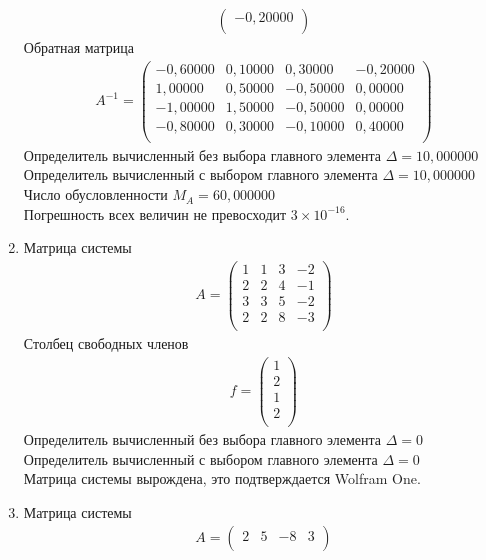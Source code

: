 \documentclass[a4paper,12pt,titlepage,finall]{article}
\begin{document}
\begin{enumerate}
\begin{align*}
\begin{pmatrix}
  -0,20000 \\
\end{pmatrix}
\end{align*}
Обратная матрица
\begin{align*}
A^{-1} = \begin{pmatrix}
-0,60000&     0,10000&     0,30000&    -0,20000 \\
   1,00000&     0,50000&    -0,50000&     0,00000 \\
  -1,00000&     1,50000&    -0,50000&     0,00000 \\
  -0,80000&     0,30000&    -0,10000&     0,40000 \\
\end{pmatrix}
\end{align*}
Определитель вычисленный без выбора главного элемента  $\Delta = 10,000000$\\
Определитель вычисленный с выбором главного элемента $\Delta = 10,000000$\\
Число обусловленности $M_A = 60,000000$\\
Погрешность всех величин не превосходит $3 \times 10^{-16}$.
\item
Матрица системы
\begin{align*}
A = \begin{pmatrix}
1&     1&     3&    -2 \\
   2&     2&     4&    -1 \\
   3&     3&     5&    -2 \\
   2&     2&     8&    -3 \\
\end{pmatrix}
\end{align*}
Столбец свободных членов
\begin{align*}
f = \begin{pmatrix}
1 \\
2 \\
1 \\
2 \\
\end{pmatrix}
\end{align*}
Определитель вычисленный без выбора главного элемента  $\Delta = 0$\\
Определитель вычисленный с выбором главного элемента $\Delta = 0$\\
Матрица системы вырождена, это подтверждается Wolfram One.
\item
Матрица системы
\begin{align*}
A = \begin{pmatrix}
2&           5&          -8&           3 \\

\end{pmatrix}
\end{align*}
\end{enumerate}
\end{document}
